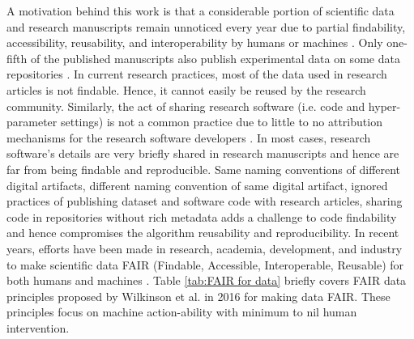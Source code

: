 \documentclass[preprint,12pt]{elsarticle}
\begin{document}
A motivation behind this work is that a considerable portion of scientific data and research manuscripts remain unnoticed every year due to partial findability, accessibility, reusability, and interoperability by humans or machines \cite{stall2019make,wilkinson2016FAIR,vogt2019FAIR,wilkinson2018design,guizzardi2020ontology,vogt2019anatomy,fantin2020distributed,hasnain2018assessing}. Only one-fifth of the published manuscripts also publish experimental data on some data repositories \cite{stall2019make}. In current research practices, most of the data used in research articles is not findable. Hence, it cannot easily be reused by the research community. Similarly, the act of sharing research software (i.e. code and hyper-parameter settings) is not a common practice due to little to no attribution mechanisms for the research software developers 
\cite{hasselbring2020FAIR}. In most cases, research software's details are very briefly shared in research manuscripts and hence are far from being findable and reproducible. Same naming conventions of different digital artifacts, different naming convention of same digital artifact, ignored practices of publishing dataset and software code with research articles, sharing code in repositories without rich metadata adds a challenge to code findability and hence compromises the algorithm reusability and reproducibility. 
In recent years, efforts have been made in research, academia, development, and industry to make scientific data FAIR (Findable, Accessible, Interoperable, Reusable) for both humans and machines \cite{wilkinson2016FAIR,stall2019make}. Table \ref{tab:FAIR for data} briefly covers FAIR data principles proposed by Wilkinson et al. \cite{wilkinson2016FAIR} in 2016 for making data FAIR. These principles focus on machine action-ability with minimum to nil human intervention.
\end{document}
